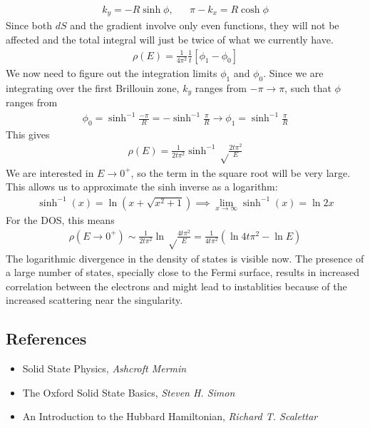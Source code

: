 \documentclass[12pt]{article}
\numberwithin{equation}{section}
\begin{document}
\begin{equation}\begin{aligned}
	k_y = -R\sinh \phi, &&\pi - k_x = R\cosh \phi
\end{aligned}\end{equation}
Since both \(dS\) and the gradient involve only even functions, they will not be affected and the total integral will just be twice of what we currently have.
\begin{equation}\begin{aligned}
	\rho(E) = \frac{1}{4\pi^2}\frac{1}{t}\left[\phi_1 - \phi_0\right] 
\end{aligned}\end{equation}
We now need to figure out the integration limits \(\phi_1\) and \(\phi_0\). Since we are integrating over the first Brillouin zone, \(k_y\) ranges from \(-\pi \to \pi\), such that \(\phi\) ranges from
\begin{equation}\begin{aligned}
	\phi_0 = \sinh^{-1}\frac{-\pi}{R} = -\sinh^{-1}\frac{\pi}{R}\to \phi_1 =\sinh^{-1}\frac{\pi}{R}
\end{aligned}\end{equation}
This gives
\begin{equation}\begin{aligned}
	\rho(E) = \frac{1}{2t\pi^2}\sinh^{-1}\sqrt\frac{2t\pi^2}{E}
\end{aligned}\end{equation}
We are interested in \(E \to 0^+\), so the term in the square root will be very large. This allows us to approximate the sinh inverse as a logarithm:
\begin{equation}\begin{aligned}
	\sinh^{-1}(x) = \ln\left( x + \sqrt{x^2 + 1} \right) \implies \lim_{x \to \infty} \sinh^{-1}(x) = \ln 2x
\end{aligned}\end{equation}
For the DOS, this means
\begin{equation}\begin{aligned}
	\rho(E \to 0^+) \sim \frac{1}{2t\pi^2} \ln \sqrt\frac{4t\pi^2}{E} = \frac{1}{4t\pi^2}\left(\ln 4t\pi^2 - \ln E\right) 
\end{aligned}\end{equation}
The logarithmic divergence in the density of states is visible now. The presence of a large number of states, specially close to the Fermi surface, results in increased correlation between the electrons and might lead to instablities because of the increased scattering near the singularity.

\newpage
\subsection*{References}
\begin{itemize}
	\item Solid State Physics, \textit{Ashcroft Mermin}
	\item The Oxford Solid State Basics, \textit{Steven H. Simon}
	\item An Introduction to the Hubbard Hamiltonian, \textit{Richard T. Scalettar}
\end{itemize}
\end{document}

